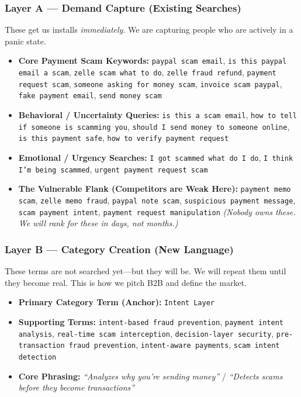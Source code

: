 \documentclass[11pt, letterpaper]{article}
\begin{document}
\subsubsection*{Layer A --- Demand Capture (Existing Searches)}
These get us installs \textit{immediately}. We are capturing people who are actively in a panic state.
\begin{itemize}
    \item \textbf{Core Payment Scam Keywords:} \texttt{paypal scam email}, \texttt{is this paypal email a scam}, \texttt{zelle scam what to do}, \texttt{zelle fraud refund}, \texttt{payment request scam}, \texttt{someone asking for money scam}, \texttt{invoice scam paypal}, \texttt{fake payment email}, \texttt{send money scam}
    \item \textbf{Behavioral / Uncertainty Queries:} \texttt{is this a scam email}, \texttt{how to tell if someone is scamming you}, \texttt{should I send money to someone online}, \texttt{is this payment safe}, \texttt{how to verify payment request}
    \item \textbf{Emotional / Urgency Searches:} \texttt{I got scammed what do I do}, \texttt{I think I'm being scammed}, \texttt{urgent payment request scam}
    \item \textbf{The Vulnerable Flank (Competitors are Weak Here):} \texttt{payment memo scam}, \texttt{zelle memo fraud}, \texttt{paypal note scam}, \texttt{suspicious payment message}, \texttt{scam payment intent}, \texttt{payment request manipulation} \textit{(Nobody owns these. We will rank for these in days, not months.)}
\end{itemize}

\subsubsection*{Layer B --- Category Creation (New Language)}
These terms are not searched yet---but they will be. We will repeat them until they become real. This is how we pitch B2B and define the market.
\begin{itemize}
    \item \textbf{Primary Category Term (Anchor):} \texttt{Intent Layer}
    \item \textbf{Supporting Terms:} \texttt{intent-based fraud prevention}, \texttt{payment intent analysis}, \texttt{real-time scam interception}, \texttt{decision-layer security}, \texttt{pre-transaction fraud prevention}, \texttt{intent-aware payments}, \texttt{scam intent detection}
    \item \textbf{Core Phrasing:} \textit{``Analyzes why you're sending money''} / \textit{``Detects scams before they become transactions''}
\end{itemize}
\end{document}
